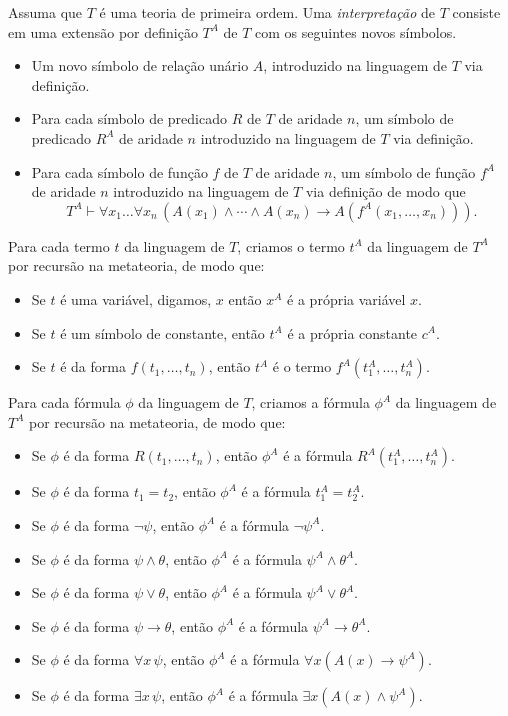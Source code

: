 \begin{metadefinition}
    Assuma que $T$ é uma teoria de primeira ordem.
    Uma \emph{interpretação} de $T$ consiste em uma extensão por definição $T^A$ de $T$ com os seguintes novos símbolos.
    \begin{itemize}
        \item Um novo símbolo de relação unário $A$, introduzido na linguagem de $T$ via definição.
        \item Para cada símbolo de predicado $R$ de $T$ de aridade $n$, um símbolo de predicado $R^A$ de aridade $n$ introduzido na linguagem de $T$ via definição.
        \item Para cada símbolo de função $f$ de $T$ de aridade $n$, um símbolo de função $f^A$ de aridade $n$ introduzido na linguagem de $T$ via definição de modo que
        \[
            T^A\vdash \forall x_1 \ldots \forall x_n\, (A(x_1)\wedge \cdots \wedge A(x_n)\to A(f^A(x_1, \dots, x_n))).
        \]
    \end{itemize}

    Para cada termo $t$ da linguagem de $T$, criamos o termo $t^A$ da linguagem de $T^A$ por recursão na metateoria, de modo que:
    \begin{itemize}
        \item Se $t$ é uma variável, digamos, $x$ então $x^A$ é a própria variável $x$.
        \item Se $t$ é um símbolo de constante, então $t^A$ é a própria constante $c^A$.
        \item Se $t$ é da forma $f(t_1, \dots, t_n)$, então $t^A$ é o termo $f^A(t_1^A, \dots, t_n^A)$.
    \end{itemize}

    Para cada fórmula $\phi$ da linguagem de $T$, criamos a fórmula $\phi^A$ da linguagem de $T^A$ por recursão na metateoria, de modo que:
    \begin{itemize}
        \item Se $\phi$ é da forma $R(t_1, \dots, t_n)$, então $\phi^A$ é a fórmula $R^A(t_1^A, \dots, t_n^A)$.
        \item Se $\phi$ é da forma $t_1=t_2$, então $\phi^A$ é a fórmula $t_1^A=t_2^A$.
        \item Se $\phi$ é da forma $\neg \psi$, então $\phi^A$ é a fórmula $\neg \psi^A$.
        \item Se $\phi$ é da forma $\psi\wedge \theta$, então $\phi^A$ é a fórmula $\psi^A\wedge \theta^A$.
        \item Se $\phi$ é da forma $\psi\vee \theta$, então $\phi^A$ é a fórmula $\psi^A\vee \theta^A$.
        \item Se $\phi$ é da forma $\psi\to \theta$, então $\phi^A$ é a fórmula $\psi^A\to \theta^A$.
        \item Se $\phi$ é da forma $\forall x\,\psi$, então $\phi^A$ é a fórmula $\forall x (A(x)\to \psi^A)$.
        \item Se $\phi$ é da forma $\exists x\,\psi$, então $\phi^A$ é a fórmula $\exists x (A(x)\wedge \psi^A)$.
    \end{itemize}


\end{metadefinition}
